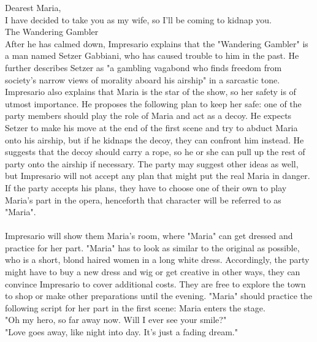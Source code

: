 %
\vfill
%
Dearest Maria,\vspace{0.6cm}\\
I have decided to take you as my wife, so I'll be coming to kidnap you.\vspace{0.6cm}\\
\hspace*{0.5cm}The Wandering Gambler\\
%
\newpage
%
After he has calmed down, Impresario explains that the "Wandering Gambler" is a man named Setzer Gabbiani, who has caused trouble to him in the past.
He further describes Setzer as "a gambling vagabond who finds freedom from society's narrow views of morality aboard his airship" in a sarcastic tone.
Impresario also explains that Maria is the star of the show, so her safety is of utmost importance.
He proposes the following plan to keep her safe: one of the party members should play the role of Maria and act as a decoy.
He expects Setzer to make his move at the end of the first scene and try to abduct Maria onto his airship, but if he kidnaps the decoy, they can confront him instead.
He suggests that the decoy should carry a rope, so he or she can pull up the rest of party onto the airship if necessary.
The party may suggest other ideas as well, but Impresario will not accept any plan that might put the real Maria in danger.
If the party accepts his plans, they have to choose one of their own to play Maria's part in the opera, henceforth that character will be referred to as "Maria".
%
\vfill
%
\\\\
%
Impresario will show them Maria's room, where "Maria" can get dressed and practice for her part.
"Maria" has to look as similar to the original as possible, who is a short, blond haired women in a long white dress.
Accordingly, the party might have to buy a new dress and wig or get creative in other ways, they can convince Impresario to cover additional costs. 
They are free to explore the town to shop or make other preparations until the evening. 
"Maria" should practice the following script for her part in the first scene:
%
\vfill
%
Maria enters the stage.\vspace{0.2cm}\\
"Oh my hero, so far away now. Will I ever see your smile?"\vspace{0.2cm}\\ 
"Love goes away, like night into day. It's just a fading dream."\vspace{0.2cm}\\ 
